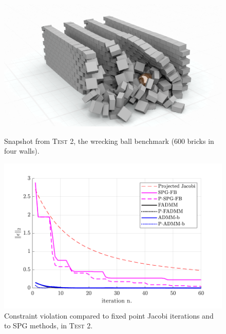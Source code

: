 \documentclass[final,3p]{elsarticle}
\begin{document}
\begin{figure}[!tbp]
  \centering
  \begin{minipage}[t]{0.48\textwidth}
    \includegraphics[width=\textwidth, trim=0cm -0cm 0cm 0cm]{pics/t8_snapshot.png}
    \caption{Snapshot from \textsc{Test 2}, the wrecking ball benchmark (600 bricks in four walls).}
		\label{fig:t6_primdual_a_ns}
  \end{minipage}
  \hfill
	\begin{minipage}[t]{0.48\textwidth}
    \includegraphics[width=\textwidth]{pics/t8_convergence.pdf}
    \caption{Constraint violation compared to fixed point Jacobi iterations and to SPG methods, in \textsc{Test 2}.}
		\label{fig:t8_convergence}
  \end{minipage}
\end{figure}
\end{document}
